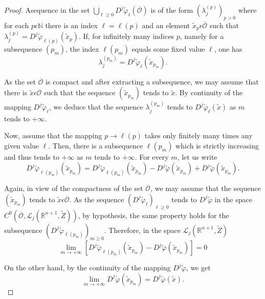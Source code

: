 \begin{proof}
A\pageoriginale sequence in the set $\bigcup\limits_{\ell \geq 0}
D^{j}\widetilde{\varphi}_{\ell} (\overline{\mathscr{O}})$ is of the
form $(\lambda_{j}^{(p)})_{p > 0}$ where for each $p \epsilon
\mathbb{N}$ there is an index $\ell = \ell(p)$ and an element
$\widetilde{x}_{p} \epsilon \overline{\mathscr{O}}$ such that
$\lambda_{j}^{(p)} = D^{j}\widetilde{\varphi}_{\ell(p)}
(\widetilde{x}_{p})$. If, for infinitely many indices $p$, namely for a
subsequence $(p_{m})$, the index $\ell(p_{m})$ equals some fixed value
$\ell$, one has
$$
\lambda_{j}^{(p_{m})} = D^{j} \widetilde{\varphi}_{\ell} (\widetilde{x}_{p_{m}}).
$$

As the set $\overline{\mathscr{O}}$ is compact and after extracting a
subsequence, we may assume that there is $\widetilde{x} \epsilon
\overline{\mathscr{O}}$ such that the sequence
$(\widetilde{x}_{p_{m}})$ tends to $\widetilde{x}$. By continuity of
the mapping $D^{j}\widetilde{\varphi}_{\ell}$, we deduce that the
sequence $\lambda_{j}^{(p_{m})}$ tends to
$D^{j}\widetilde{\varphi}_{\ell}(\widetilde{x})$ as $m$ tends to $+
\infty$.

Now, assume that the mapping $p \to \ell(p)$ takes only finitely many
times any given value $\ell$. Then, there is a subsequence
$\ell(p_{m})$ which is strictly increasing and thus tends to $+
\infty$ as $m$ tends to $+ \infty$. For every $m$, let us write
$$
D^{j}\widetilde{\varphi}_{\ell(p_{m})} (\widetilde{x}_{p_{m}}) =
D^{j}\widetilde{\varphi}_{\ell(p_{m})} (\widetilde{x}_{p_{m}}) -
D^{j}\widetilde{\varphi}(\widetilde{x}_{p_{m}}) +
D^{j}\widetilde{\varphi}(\widetilde{x}_{p_{m}}). 
$$

Again, in view of the compactness of the set $\overline{\mathscr{O}}$,
we may assume that the sequence $(\widetilde{x}_{p_{m}})$ tends to
$\widetilde{x} \epsilon \overline{\mathscr{O}}$. As the sequence
$(D^{j} \widetilde{\varphi}_{\ell})_{\ell \geq 0}$ tends to
$D^{j}\widetilde{\varphi}$ in the space $C^{0}
(\overline{\mathscr{O}}, \mathscr{L}_{j}(\mathbb{R}^{n+1},
\widetilde{Z}))$, by hypothesis, the same property holds for the
subsequence $(D^{j}\widetilde{\varphi}_{\ell(p_{m})})_{m \geq
  0}$. Therefore, in the space $\mathscr{L}_{j}(\mathbb{R}^{n+1},
\widetilde{Z})$ 
$$
\lim_{m \to + \infty} \left[D^{j}\widetilde{\varphi}_{\ell(p_{m})}
  (\widetilde{x}_{p_{m}}) -
  D^{j}\widetilde{\varphi}(\widetilde{x}_{p_{m}})\right] = 0
$$

On the other hand, by the continuity of the mapping
$D^{j}\widetilde{\varphi}$, we get
$$
\lim_{m \to + \infty} D^{j}\widetilde{\varphi}(\widetilde{x}_{p_{m}})
= D^{j}\widetilde{\varphi}(\widetilde{x}).
$$\pageoriginale


\end{proof}
